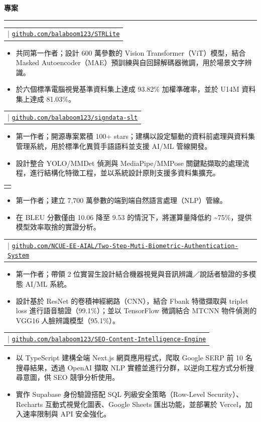 \documentclass[10pt,a4paper]{article}
\makeatletter
\newcommand{\plainlink}[1]{\uline{\nolinkurl{#1}}}
\newcommand{\sectiontitle}[1]{%
  \vspace{5pt}
  {\large\textbf{#1}}\par
  \vspace{-1pt}
  \hrule
  \vspace{2pt}
}
\newcommand{\projectentry}[2]{%
  \begin{tabularx}{\textwidth}{@{}>{\raggedright\arraybackslash}X@{}}
    {\small\textbf{#1}} \;|\; {\scriptsize #2}
  \end{tabularx}
  \par
}
\newcommand{\projectentrynolink}[1]{%
  \begin{tabularx}{\textwidth}{@{}>{\raggedright\arraybackslash}X@{}}
    {\small\textbf{#1}}
  \end{tabularx}
  \par
}
\makeatother
\begin{document}
\sectiontitle{專案}
\projectentry
  {STRLite：可調適場景文字辨識的輕量化遮罩自編碼器}
  {\plainlink{github.com/balaboom123/STRLite}}
\begin{itemize}
  \item 共同第一作者；設計 600 萬參數的 Vision Transformer（ViT）模型，結合 Masked Autoencoder（MAE）預訓練與自回歸解碼器微調，用於場景文字辨識。
  \item 於六個標準電腦視覺基準資料集上達成 93.82\% 加權準確率，並於 U14M 資料集上達成 81.03\%。
\end{itemize}
\vspace{3pt}
\projectentry
  {SignDATA：手語翻譯資料處理管線}
  {\plainlink{github.com/balaboom123/signdata-slt}}
\begin{itemize}
  \item 第一作者；開源專案累積 100+ stars；建構以設定驅動的資料前處理與資料集管理系統，用於標準化異質手語語料並支援 AI/ML 管線開發。
  \item 設計整合 YOLO/MMDet 偵測與 MediaPipe/MMPose 關鍵點擷取的處理流程，進行結構化特徵工程，並以系統設計原則支援多資料集擴充。
\end{itemize}
\vspace{3pt}
\projectentrynolink
  {邁向輕量化手語翻譯：幀率與模型規模之取捨}
\begin{itemize}
  \item 第一作者；建立 7,700 萬參數的端到端自然語言處理（NLP）管線。
  \item 在 BLEU 分數僅由 10.06 降至 9.53 的情況下，將運算量降低約 {\textasciitilde}75\%，提供模型效率取捨的實證分析。
\end{itemize}
\vspace{3pt}
\projectentry
  {雙步驟驗證：結合語音與人臉辨識的多生物特徵系統}
  {\plainlink{github.com/NCUE-EE-AIAL/Two-Step-Muti-Biometric-Authentication-System}}
\begin{itemize}
  \item 第一作者；帶領 2 位實習生設計結合機器視覺與音訊辨識／說話者驗證的多模態 AI/ML 系統。
  \item 設計基於 ResNet 的卷積神經網路（CNN），結合 Fbank 特徵擷取與 triplet loss 進行語音驗證（99.1\%）；並以 TensorFlow 微調結合 MTCNN 物件偵測的 VGG16 人臉辨識模型（95.1\%）。
\end{itemize}
\vspace{3pt}
\projectentry
  {SEO 內容智慧分析引擎}
  {\plainlink{github.com/balaboom123/SEO-Content-Intelligence-Engine}}
\begin{itemize}
  \item 以 TypeScript 建構全端 Next.js 網頁應用程式，爬取 Google SERP 前 10 名搜尋結果，透過 OpenAI 擷取 NLP 實體並進行分群，以逆向工程方式分析搜尋意圖，供 SEO 競爭分析使用。
  \item 實作 Supabase 身份驗證搭配 SQL 列級安全策略（Row-Level Security）、Recharts 互動式視覺化圖表、Google Sheets 匯出功能，並部署於 Vercel，加入速率限制與 API 安全強化。
\end{itemize}
\end{document}

